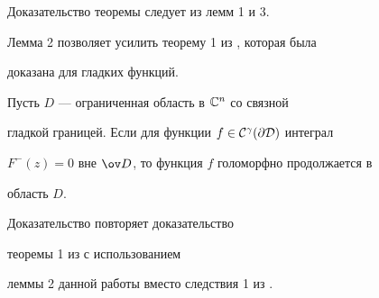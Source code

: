 Доказательство теоремы следует из лемм 1 и 3.





Лемма 2 позволяет усилить теорему 1 из \cite{KM}, которая была


доказана для гладких функций.





\begin{cornonum}


Пусть $D$ --- ограниченная область в $\Bbb C^n$ со связной


гладкой границей. Если для функции $f\in\cal C^\gamma(\partial D)$ интеграл


$F^-(z)=0$ вне $\ov D$, то функция $f$ голоморфно продолжается в


область $D$.


\end{cornonum}





Доказательство повторяет доказательство


теоремы 1 из \cite{KM} с использованием


леммы 2 данной работы вместо следствия 1 из \cite{KM}.








